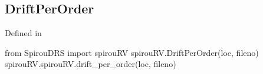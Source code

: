 \noindent\begin{minipage}{\textwidth}
\subsection{DriftPerOrder}

Defined in \spirouRV{}

\begin{pythonbox}
from SpirouDRS import spirouRV
spirouRV.DriftPerOrder(loc, fileno)
spirouRV.spirouRV.drift_per_order(loc, fileno)
\end{pythonbox}

\begin{pythondocstring}

\end{pythondocstring}
\end{minipage}

